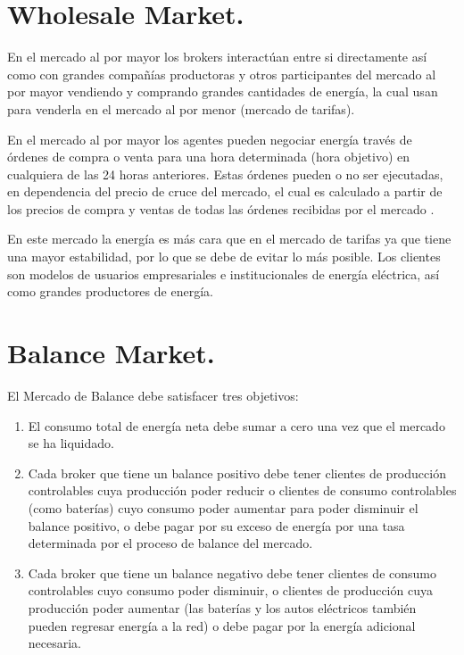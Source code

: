 \section{Wholesale Market.}

En el mercado al por mayor los brokers interactúan entre si directamente así como con grandes compañías productoras y otros participantes del mercado al por mayor vendiendo y comprando grandes cantidades de energía, la cual usan para venderla en el mercado al por menor (mercado de tarifas). 

En el mercado al por mayor los agentes pueden negociar energía través de órdenes de compra o venta para una hora determinada (hora objetivo) en cualquiera de las 24 horas anteriores. Estas órdenes pueden o no ser ejecutadas, en dependencia del precio de cruce del mercado, el cual es calculado a partir de los precios de compra y ventas de todas las órdenes recibidas por el mercado \cite{WKetterJCollinsyMdWeerdtThe2016PowerTAC}.

En este mercado la energía es más cara que en el mercado de tarifas ya que tiene una mayor estabilidad, por lo que se debe de evitar lo más posible. Los clientes son modelos de usuarios empresariales e institucionales de energía eléctrica, así como grandes productores de energía.

\section{Balance Market.}

El Mercado de Balance debe satisfacer tres objetivos:
\begin{enumerate}
	\item El consumo total de energía neta debe sumar a cero una vez que el mercado se ha liquidado.     
	\item Cada broker que tiene un balance positivo debe tener clientes de producción controlables cuya producción poder reducir o clientes de consumo controlables (como baterías) cuyo consumo poder aumentar para poder disminuir el balance positivo, o debe pagar por su exceso de energía por una tasa determinada por el proceso de balance del mercado.
	\item Cada broker que tiene un balance negativo debe tener clientes de consumo controlables cuyo consumo poder disminuir, o clientes de producción cuya producción poder aumentar (las baterías y los autos eléctricos también pueden regresar energía a la red) o debe pagar por la energía adicional necesaria.
\end{enumerate}


